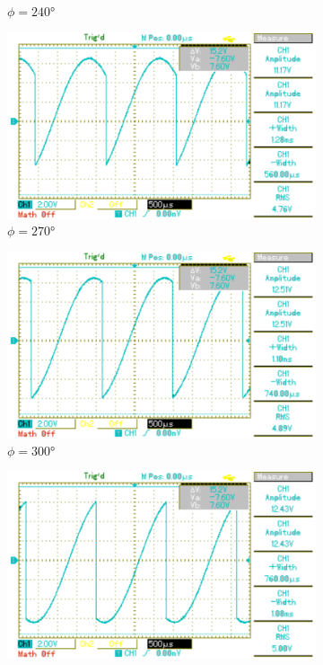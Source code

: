 \begin{figure}[p]
\begin{subfigure}{0.32\textwidth}
		\caption{$\phi=240°$}
	\end{subfigure}
	\begin{subfigure}{0.32\textwidth}
		\includegraphics[width=\textwidth]{Bilder/MAP014.pdf}
		\caption{$\phi=270°$}
	\end{subfigure}
	\begin{subfigure}{0.32\textwidth}
		\includegraphics[width=\textwidth]{Bilder/MAP015.pdf}
		\caption{$\phi=300°$}
	\end{subfigure}
	\begin{subfigure}{0.32\textwidth}
		\includegraphics[width=\textwidth]{Bilder/MAP016.pdf}

\end{subfigure}
\end{figure}
